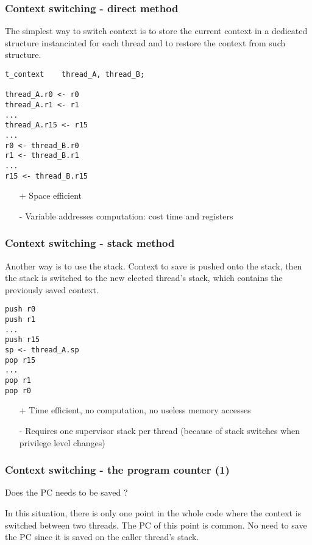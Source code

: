 
\begin{frame}[containsverbatim]
  \frametitle{Context switching - direct method}

  The simplest way to switch context is to store the current context
  in a dedicated structure instanciated for each thread and to restore
  the context from such structure.

  \begin{verbatim}
t_context    thread_A, thread_B;

thread_A.r0 <- r0
thread_A.r1 <- r1
...
thread_A.r15 <- r15
...
r0 <- thread_B.r0
r1 <- thread_B.r1
...
r15 <- thread_B.r15
  \end{verbatim}

  \begin{itemize}
  \item[+]
    Space efficient
  \item[-]
    Variable addresses computation: cost time and registers
  \end{itemize}

\end{frame}


\begin{frame}[containsverbatim]
  \frametitle{Context switching - stack method}

  Another way is to use the stack. Context to save is pushed onto the
  stack, then the stack is switched to the new elected thread's stack,
  which contains the previously saved context.

  \begin{verbatim}
push r0
push r1
...
push r15
sp <- thread_A.sp
pop r15
...
pop r1
pop r0
  \end{verbatim}

  \begin{itemize}
  \item[+]
    Time efficient, no computation, no useless memory accesses
  \item[-]
    Requires one supervisor stack per thread (because of stack
    switches when privilege level changes)
  \end{itemize}

\end{frame}


\begin{frame}[containsverbatim]
  \frametitle{Context switching - the program counter (1)}

  Does the PC needs to be saved ?

  \begin{center}
  \end{center}

  In this situation, there is only one point in the whole code where
  the context is switched between two threads. The PC of this point is
  common. No need to save the PC since it is saved on the caller
  thread's stack.

\end{frame}

